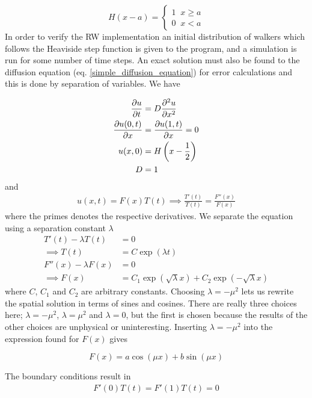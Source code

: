\begin{equation}\label{Heaviside_def}
 H(x-a) = \begin{cases}
           1\;\;x\geq a\\
           0\;\;x<a
          \end{cases}
\end{equation}
In order to verify the RW implementation an initial distribution of walkers which follows the Heaviside step function is given to the program, and a simulation is run for some number of time steps. 
An exact solution must also be found to the diffusion equation (eq. \ref{simple_diffusion_equation}) for error calculations and this is done by separation of variables. We have

\begin{align}
 \frac{\partial u}{\partial t} &= D\frac{\partial^2 u}{\partial x^2}\\
 \frac{\partial u(0,t)}{\partial x} &= \frac{\partial u(1,t)}{\partial x} = 0 \\
 u(x,0) &= H\left(x-\frac{1}{2}\right)\\
 D &= 1
\end{align}
and
\begin{align*}
 u(x,t) = F(x)T(t) \implies \frac{T'(t)}{T(t)} = \frac{F''(x)}{F(x)}
\end{align*}
where the primes denotes the respective derivatives. We separate the equation using a separation constant $\lambda$
\begin{align*}
 T'(t)-\lambda T(t) &= 0 \\
 \implies T(t) &= C\exp(\lambda t)\\
 F''(x) -\lambda F(x) &= 0 \\
 \implies F(x) &= C_1\exp(\sqrt{\lambda}x) + C_2\exp(-\sqrt{\lambda}x)
\end{align*}
where $C$, $C_1$ and $C_2$ are arbitrary constants. 
Choosing $\lambda = -\mu^2$ lets us rewrite the spatial solution in terms of sines and cosines. 
There are really three choices here; $\lambda = -\mu^2$, $\lambda = \mu^2$ and $\lambda = 0$, but the first is chosen because the results of the other choices are unphysical or uninteresting. 
Inserting $\lambda = -\mu^2$ into the expression found for $F(x)$ gives

\begin{equation*}
 F(x) = a\cos(\mu x) + b\sin(\mu x)
\end{equation*}

The boundary conditions result in
\begin{align*}
 F'(0)T(t) = F'(1)T(t) = 0
\end{align*}

